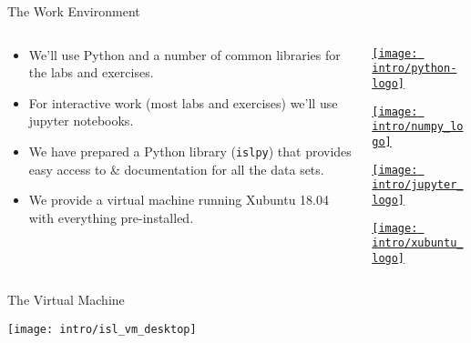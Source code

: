 \documentclass[mathserif, aspectratio=169]{beamer}
\begin{document}
\begin{frame}{The Work Environment}
	\begin{columns}
		\begin{column}{0.6\textwidth}
			\begin{itemize}
				\item We'll use Python and a number of common libraries
					for the labs and exercises.
				\item For interactive work (most labs and exercises) we'll use
					jupyter notebooks.
				\item We have prepared a Python library ({\tt islpy}) that provides
					easy access to \& documentation for all the data sets.
				\item We provide a virtual machine running Xubuntu 18.04 with everything
					pre-installed.
			\end{itemize}
		\end{column}
		\begin{column}{0.4\textwidth}
			\begin{center}
				\href{https://www.python.org/}{\texttt{[image: intro/python-logo]}}
			\end{center}
			\begin{center}
				\href{https://numpy.org/}{\texttt{[image: intro/numpy\_logo]}}
			\end{center}
			\begin{center}
				\href{https://jupyter.org/}{\texttt{[image: intro/jupyter\_logo]}}
			\end{center}
			\begin{center}
				\href{https://xubuntu.org/}{\texttt{[image: intro/xubuntu\_logo]}}
			\end{center}
		\end{column}
	\end{columns}
\end{frame}

\begin{frame}{The Virtual Machine}
	\begin{center}
		\texttt{[image: intro/isl\_vm\_desktop]}
	\end{center}
\end{frame}
\end{document}
